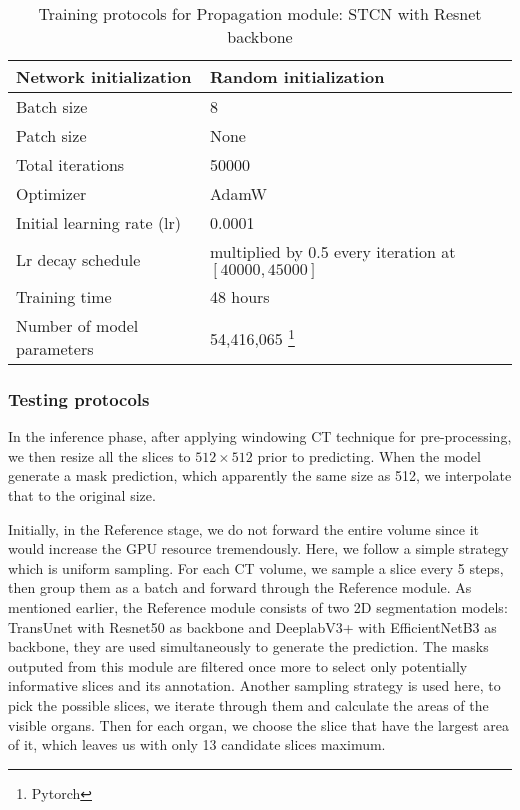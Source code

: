 \begin{table*}[h]
\caption{Training protocols for Propagation module: STCN with Resnet backbone }
\label{table:training2}
\begin{center}
\begin{tabular}{ll} 
\hline
Network initialization         & Random initialization\\
\hline
Batch size                    & 8 \\
\hline 
Patch size & None  \\ 
\hline
Total iterations & 50000 \\
\hline
Optimizer          & AdamW          \\ \hline
Initial learning rate (lr)  & 0.0001 \\ \hline
Lr decay schedule & multiplied by 0.5 every iteration at $[40000, 45000]$ \\
\hline
Training time                                           & 48 hours \\  \hline 
Number of model parameters    & 54,416,065 \footnote{Pytorch} \\ \hline
\end{tabular}


\end{center}
\end{table*}

\vspace{-0.5cm}
\subsubsection{Testing protocols}

In the inference phase, after applying windowing CT technique for pre-processing, we then resize all the slices to $512 \times 512$ prior to predicting. When the model generate a mask prediction, which apparently the same size as 512, we interpolate that to the original size.

Initially, in the Reference stage, we do not forward the entire volume since it would increase the GPU resource tremendously. Here, we follow a simple strategy which is uniform sampling. For each CT volume, we sample a slice every 5 steps, then group them as a batch and forward through the Reference module. As mentioned earlier, the Reference module consists of two 2D segmentation models: TransUnet with Resnet50 as backbone and DeeplabV3+ with EfficientNetB3 as backbone, they are used simultaneously to generate the prediction.
The masks outputed from this module are filtered once more to select only potentially informative slices and its annotation. Another sampling strategy is used here, to pick the possible slices, we iterate through them and calculate the areas of the visible organs. Then for each organ, we choose the slice that have the largest area of it, which leaves us with only 13 candidate slices maximum.

